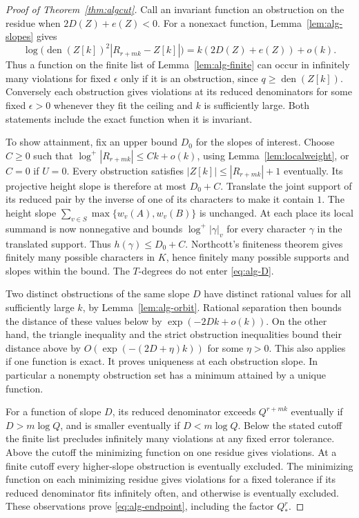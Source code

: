 \documentclass[11pt,a4paper,reqno]{amsart}
\theoremstyle{definition}
\theoremstyle{remark}
\numberwithin{equation}{section}
\begin{document}
\begin{proof}[Proof of Theorem~\ref{thm:algcut}]
Call an invariant function an obstruction on the residue when
\(2D(Z)+e(Z)<0\). For a nonexact function,
Lemma~\ref{lem:alg-slopes} gives
\[
 \log\bigl(\operatorname{den}(Z[k])^2|R_{r+mk}-Z[k]|\bigr)
   = k(2D(Z)+e(Z))+o(k).
\]
Thus a function on the finite list of Lemma~\ref{lem:alg-finite}
can occur in infinitely many violations for fixed \(\epsilon\) only
if it is an obstruction, since \(q\ge\operatorname{den}(Z[k])\).
Conversely each obstruction gives violations at its reduced
denominators for some fixed \(\epsilon>0\) whenever they fit the
ceiling and \(k\) is sufficiently large. Both statements include the
exact function when it is invariant.

To show attainment, fix an upper bound \(D_0\) for the slopes of
interest. Choose \(C\ge0\) such that
\(\log^+|R_{r+mk}|\le Ck+o(k)\), using
Lemma~\ref{lem:localweight}, or \(C=0\) if \(U=0\).
Every obstruction satisfies \(|Z[k]|\le |R_{r+mk}|+1\) eventually.
Its projective height slope is therefore at most \(D_0+C\).
Translate the joint support of its reduced pair by the inverse of
one of its characters to make it contain \(1\). The height slope
\(\sum_{v\in S}\max\{w_v(A),w_v(B)\}\) is unchanged. At each place
its local summand is now nonnegative and bounds
\(\log^+|\gamma|_v\) for every character \(\gamma\) in the
translated support. Thus \(h(\gamma)\le D_0+C\).
Northcott's finiteness theorem \cite[Lemma~2]{Northcott1950}
gives finitely many possible characters in \(K\), hence finitely
many possible supports and slopes within the bound. The \(T\)-degrees
do not enter \eqref{eq:alg-D}.

Two distinct obstructions of the same slope \(D\) have distinct
rational values for all sufficiently large \(k\), by
Lemma~\ref{lem:alg-orbit}. Rational separation then bounds the
distance of these values below by
\(\exp(-2Dk+o(k))\). On the other hand, the triangle inequality and
the strict obstruction inequalities bound their distance above by
\(O(\exp(-(2D+\eta)k))\) for some \(\eta>0\). This also applies if
one function is exact. It proves uniqueness at each obstruction
slope. In particular a nonempty obstruction set has a minimum
attained by a unique function.

For a function of slope \(D\), its reduced denominator exceeds
\(Q^{r+mk}\) eventually if \(D>m\log Q\), and is smaller eventually
if \(D<m\log Q\). Below the stated cutoff the finite list precludes
infinitely many violations at any fixed error tolerance. Above
the cutoff the minimizing function on one residue gives violations.
At a finite cutoff every higher-slope obstruction is eventually
excluded. The minimizing function on each minimizing residue gives
violations for a fixed tolerance if its reduced denominator fits
infinitely often, and otherwise is eventually excluded. These
observations prove \eqref{eq:alg-endpoint}, including the factor
\(Q_*^r\).
\end{proof}
\end{document}
